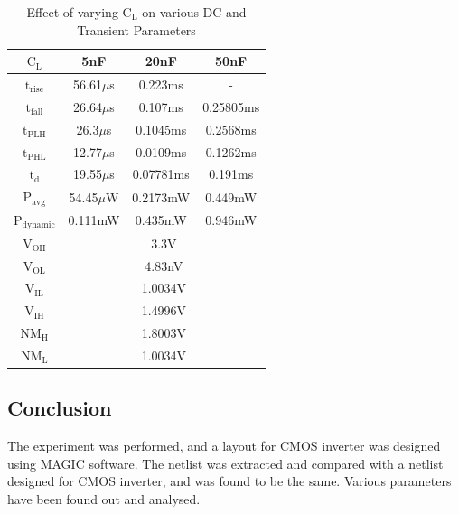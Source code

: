 \documentclass[12pt, a4paper]{article}
\begin{document}
	\begin{table}[H]
		\begin{center}
			\begin{tabular}{|c|c|c|c|}
				\hline 
				\rule[-1ex]{0pt}{2.5ex} $\text{C}_\text{L}$ & 5nF & 20nF & 50nF \\ 
				\hline 
				\rule[-1ex]{0pt}{2.5ex}
				$\text{t}_\text{rise}$ & 56.61$\mu$s & 0.223ms & - \\ 
				$\text{t}_\text{fall}$ & 26.64$\mu$s & 0.107ms & 0.25805ms \\ 
				$\text{t}_\text{PLH}$ & 26.3$\mu$s & 0.1045ms & 0.2568ms \\ 
				$\text{t}_\text{PHL}$ & 12.77$\mu$s & 0.0109ms & 0.1262ms \\ 
				$\text{t}_\text{d}$ & 19.55$\mu$s & 0.07781ms & 0.191ms \\ 
				$\text{P}_\text{avg}$ & 54.45$\mu$W  & 0.2173mW & 0.449mW \\ 
				$\text{P}_\text{dynamic}$ & 0.111mW  & 0.435mW & 0.946mW \\ 
				\hline $\text{V}_\text{OH}$ &\multicolumn{3}{|c|}{3.3V}\\ 
				$\text{V}_\text{OL}$ & \multicolumn{3}{|c|}{4.83nV} \\ 
				$\text{V}_\text{IL}$ & \multicolumn{3}{|c|}{1.0034V} \\ 
				$\text{V}_\text{IH}$ & \multicolumn{3}{|c|}{1.4996V} \\ 
				$\text{NM}_\text{H}$ & \multicolumn{3}{|c|}{1.8003V} \\ 
				$\text{NM}_\text{L}$ & \multicolumn{3}{|c|}{1.0034V}\\ 
				\hline 
			\end{tabular} 
		\end{center}
		\caption{Effect of varying $\text{C}_\text{L}$ on various DC and Transient Parameters}
		\label{table::tablevarycllayout}
	\end{table}
	
	\subsection{Conclusion}
	The experiment was performed, and a layout for CMOS inverter was designed using MAGIC software. The netlist was extracted and compared with a netlist designed for CMOS inverter, and was found to be the same. Various parameters have been found out and analysed.
	
\end{document}

